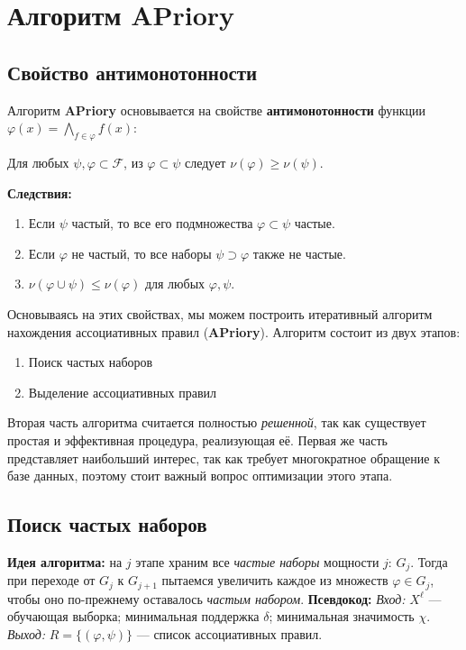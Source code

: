 \section{Алгоритм APriory}

\subsection{Свойство антимонотонности}
Алгоритм \textbf{APriory} основывается на свойстве \textbf{антимонотонности} функции \( \varphi(x)= \bigwedge_{f \in \varphi} f(x)\):

Для любых \( \psi, \varphi \subset \mathcal{F} \), из \( \varphi \subset \psi \) следует \( \nu(\varphi) \geq \nu(\psi) \).

\textbf{Следствия:}

\begin{enumerate}
    \item Если \( \psi \) частый, то все его подмножества \( \varphi \subset \psi \) частые.
    \item Если \( \varphi \) не частый, то все наборы \( \psi \supset \varphi \) также не частые.
    \item \( \nu(\varphi \cup \psi) \leq \nu(\varphi) \) для любых \( \varphi, \psi \).
\end{enumerate}

Основываясь на этих свойствах, мы можем построить итеративный алгоритм нахождения ассоциативных правил (\textbf{APriory}). Алгоритм состоит из двух этапов:

\begin{enumerate}
    \item Поиск частых наборов 
    \item Выделение ассоциативных правил
\end{enumerate}

Вторая часть алгоритма считается полностью \textit{решенной}, так как существует простая и эффективная процедура, реализующая её. Первая же часть представляет наибольший интерес, так как требует многократное обращение к базе данных, поэтому стоит важный вопрос оптимизации этого этапа.

\subsection{Поиск частых наборов}

\textbf{Идея алгоритма:} на \( j\) этапе храним все \textit{частые наборы} мощности \(j\): \(G_j\). Тогда при переходе от \(G_j\) к \(G_{j+1}\) пытаемся увеличить каждое из множеств \(\varphi \in G_j\), чтобы оно по-прежнему оставалось \textit{частым набором}.
\newline\newline
\textbf{Псевдокод:}
\newline
\textit{Вход:} \( X^\ell \) — обучающая выборка; минимальная поддержка \( \delta \); минимальная значимость \( \chi \).
\newline
\textit{Выход:} \( R = \{(\varphi, \psi)\} \) — список ассоциативных правил.

